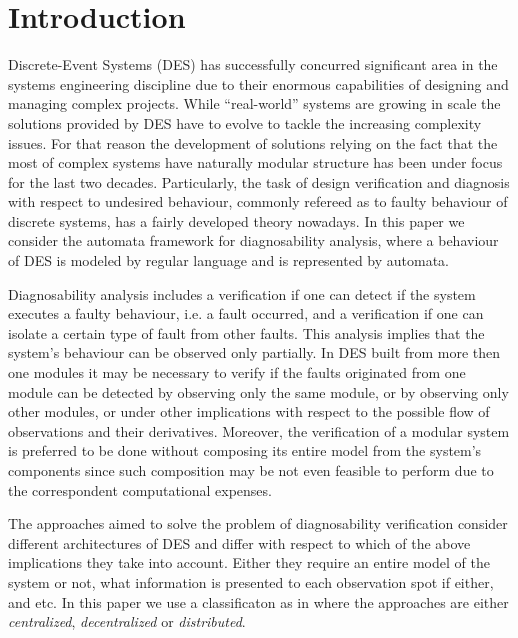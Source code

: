 \documentclass[a4paper, 10pt, conference]{ieeeconf}
\begin{document}
\section{Introduction}

Discrete-Event Systems (DES) has successfully concurred significant area in the
systems engineering discipline due to their enormous capabilities of designing
and managing complex projects. While ``real-world'' systems are growing in scale
the solutions provided by DES have to evolve to tackle the increasing complexity
issues. For that reason the development of solutions relying on the fact that
the most of complex systems have naturally modular structure has been under
focus for the last two decades. Particularly, the task of design verification and
diagnosis with respect to undesired behaviour, commonly refereed as to faulty
behaviour of discrete systems, has a fairly developed theory nowadays.
In this paper we consider the automata framework for diagnosability analysis,
where a behaviour of DES is modeled by regular language and is represented
by automata.

Diagnosability analysis includes a verification if one can detect if the system
executes a faulty behaviour, i.e. a fault occurred, and a verification if one
can isolate a certain type of fault from other faults. This analysis implies
that the system's behaviour can be observed only partially. In DES built from more
then one modules it may be necessary to verify if the faults originated from one
module can be detected by observing only the same module, or by observing only
other modules, or under other implications with respect to the possible flow of
observations and their derivatives. Moreover, the verification of a modular
system is preferred to be done without composing its entire model from the
system's components since such composition may be not even feasible to perform
due to the correspondent computational expenses.

The approaches aimed to solve the problem of diagnosability verification
consider different architectures of DES and differ with respect to which of the
above implications they take into account. Either they require an entire model
of the system or not, what information is presented to each observation spot if
either, and etc. In this paper we use a classificaton as in
\cite{su_global_2005} where the approaches are either \emph{centralized},
\emph{decentralized} or \emph{distributed}.
\end{document}
